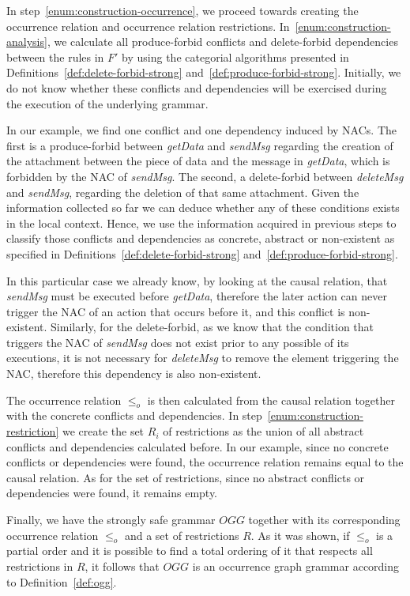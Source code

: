 In step~\ref{enum:construction-occurrence}, we proceed towards creating the occurrence relation and occurrence relation restrictions. 
  In~\ref{enum:construction-analysis}, we calculate all produce-forbid conflicts and delete-forbid dependencies between the rules in $F'$ by using the categorial algorithms presented in Definitions~\ref{def:delete-forbid-strong} and~\ref{def:produce-forbid-strong}. 
  Initially, we do not know whether these conflicts and dependencies will be exercised during the execution of the underlying grammar. 

  In our example, we find one conflict and one dependency induced by NACs. The first is a produce-forbid between \emph{getData} and \emph{sendMsg} regarding the creation of the attachment between the piece of data and the message in \emph{getData}, which is forbidden by the NAC of \emph{sendMsg}.
  The second, a delete-forbid between \emph{deleteMsg} and \emph{sendMsg}, regarding the deletion of that same attachment.
  Given the information collected so far we can deduce whether any of these
conditions exists in the local context.
  Hence, we use the information acquired in previous steps to classify those conflicts and dependencies as concrete, abstract or non-existent as specified in
Definitions~\ref{def:delete-forbid-strong} and~\ref{def:produce-forbid-strong}. 

In this particular case we already know, by looking at the causal relation, that \emph{sendMsg} must be executed before \emph{getData}, therefore the later action can never trigger the NAC of an action that occurs before it, and this conflict is non-existent. Similarly, for the delete-forbid, as we know that the condition that triggers the NAC of \emph{sendMsg} does not exist prior to any possible of its executions, it is not necessary for \emph{deleteMsg} to remove the element triggering the NAC, therefore this dependency is also non-existent.

The occurrence relation $\leq_o$ is then calculated from the causal relation together with the concrete conflicts and dependencies. In step~\ref{enum:construction-restriction} we create the set $R_i$ of restrictions as the union of all abstract conflicts and dependencies calculated before. In our example, since no concrete conflicts or dependencies were found, the occurrence relation remains equal to the causal relation. As for the set of restrictions, since no abstract conflicts or dependencies
were found, it remains empty.

Finally, we have the strongly safe grammar $OGG$ together with its corresponding occurrence relation $\leq_o$ and a set of restrictions $R$. As it was shown, if $\leq_o$ is a partial order and it is possible to find a total ordering of it that respects all restrictions in $R$, it follows that $OGG$ is an occurrence graph grammar according to Definition~\ref{def:ogg}.
\linebreak

